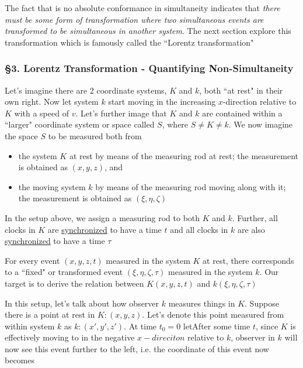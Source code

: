 The fact that is no absolute conformance in simultaneity indicates that \textit{there must be some form of
transformation where two simultaneous events are transformed to be simultaneous in another system}. The next section
explore this transformation which is famously called the ``Lorentz transformation"

\subsubsection{\hfil \S3. Lorentz Transformation - Quantifying Non-Simultaneity \hfil}

\begin{tcolorbox}[
    breakable,
    enhanced,
    arc=3mm,
    boxrule=1.5mm,
    boxsep=1.5mm,
    colback=yellow!20!white,
    colframe=blue,
    borderline={1mm}{1mm}{white},
    borderline={1mm}{2mm}{red}
]
    Let's imagine there are 2 coordinate systems, $K$ and $k$, both ``at rest" in their own right. Now let system $k$
    start moving in the increasing $x$-direction relative to $K$ with a speed of $v$. Let's further image that $K$ and
    $k$ are contained within a ``larger" coordinate system or space called $S$, where $S \ne K \ne k$. We now imagine
    the space $S$ to be measured both from

    \begin{itemize}
        \item the system $K$ at rest by means of the measuring rod at rest; the measurement is obtained as $(x, y, z)$,
              and
        \item the moving system $k$ by means of the measuring rod moving along with it; the measurement is obtained as
              $(\xi, \eta, \zeta)$
    \end{itemize}

    In the setup above, we assign a measuring rod to both $K$ and $k$. Further, all clocks in $K$ are
    \hyperref[def:synchronism]{synchronized} to have a time $t$ and all clocks in $k$ are also
    \hyperref[def:synchronism]{synchronized} to have a time $\tau$

    For every event $(x, y, z, t)$ measured in the system $K$ at rest, there corresponds to a ``fixed" or transformed
    event $(\xi, \eta, \zeta, \tau)$ measured in the system $k$. Our target is to derive the relation between
    $K(x, y, z, t)$ and $k(\xi, \eta, \zeta, \tau)$
\end{tcolorbox}

In this setup, let's talk about how observer $k$ measures things in $K$. Suppose there is a point at rest in
$K: (x, y, z)$. Let's denote this point measured from within system $k$ as $k: (x', y', z')$. At time $t_0 = 0$ letAfter some time $t$, since
$K$ is effectively moving to in the negative $x-direciton$ relative to $k$, observer in $k$ will now see this event
further to the left, i.e. the coordinate of this event now becomes

